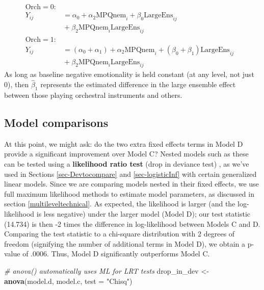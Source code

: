 \documentclass[
]{krantz}
\newenvironment{Shaded}{\begin{snugshade}}{\end{snugshade}}
\newcommand{\CommentTok}[1]{\textcolor[rgb]{0.37,0.37,0.37}{\textit{#1}}}
\newcommand{\DataTypeTok}[1]{\textcolor[rgb]{0.27,0.27,0.27}{#1}}
\newcommand{\KeywordTok}[1]{\textcolor[rgb]{0.27,0.27,0.27}{\textbf{#1}}}
\newcommand{\NormalTok}[1]{#1}
\newcommand{\StringTok}[1]{\textcolor[rgb]{0.5,0.5,0.5}{#1}}
\begin{document}
\begin{align*}
\textrm{Orch}=0: & & \\
Y_{ij} & = \alpha_{0}+\alpha_{2}\textrm{MPQnem}_{i}+\beta_{0}\textrm{LargeEns}_{ij} \\
 & \textrm{} +\beta_{2}\textrm{MPQnem}_{i}\textrm{LargeEns}_{ij} \\
\textrm{Orch}=1: & \\
Y_{ij} & = (\alpha_{0}+\alpha_{1})+\alpha_{2}\textrm{MPQnem}_{i}+(\beta_{0}+\beta_{1})\textrm{LargeEns}_{ij} \\
 & \textrm{} +\beta_{2}\textrm{MPQnem}_{i}\textrm{LargeEns}_{ij}
\end{align*}
As long as baseline negative emotionality is held constant (at any level, not just 0), then \(\hat{\beta}_{1}\) represents the estimated difference in the large ensemble effect between those playing orchestral instruments and others.

\hypertarget{compare:modeld}{%
\subsection{Model comparisons}\label{compare:modeld}}

At this point, we might ask: do the two extra fixed effects terms in Model D provide a significant improvement over Model C? Nested models such as these can be tested using a \textbf{likelihood ratio test}  (drop in deviance test) , as we've used in Sections \ref{sec-Devtocompare} and \ref{sec-logisticInf} with certain generalized linear models. Since we are comparing models nested in their fixed effects, we use full maximum likelihood methods to estimate model parameters, as discussed in section \ref{multileveltechnical}. As expected, the likelihood is larger (and the log-likelihood is less negative) under the larger model (Model D); our test statistic (14.734) is then -2 times the difference in log-likelihood between Models C and D. Comparing the test statistic to a chi-square distribution with 2 degrees of freedom (signifying the number of additional terms in Model D), we obtain a p-value of .0006. Thus, Model D significantly outperforms Model C.

\begin{Shaded}
\begin{Highlighting}[]
\CommentTok{# anova() automatically uses ML for LRT tests}
\NormalTok{drop_in_dev <-}\StringTok{ }\KeywordTok{anova}\NormalTok{(model.d, model.c, }\DataTypeTok{test =} \StringTok{"Chisq"}\NormalTok{)}
\end{Highlighting}
\end{Shaded}
\end{document}
